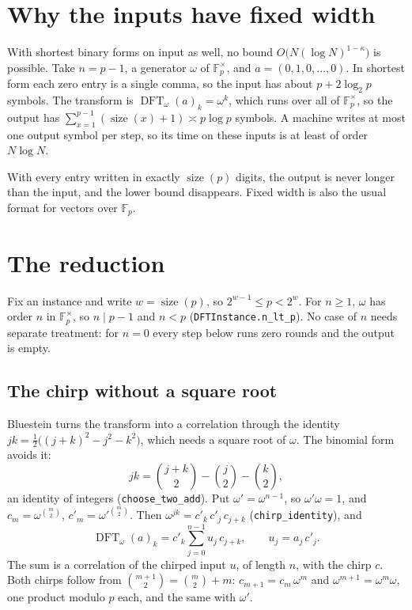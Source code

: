\documentclass[11pt]{amsart}
\newcommand{\F}{\mathbb{F}}
\newcommand{\size}{\operatorname{size}}
\newcommand{\DFT}{\operatorname{DFT}}
\newcommand{\lean}[1]{\texttt{#1}}
\begin{document}
\section{Why the inputs have fixed width}
\label{sec:width}

With shortest binary forms on input as well, no bound $O\bigl(N (\log N)^{1-\kappa}\bigr)$ is
possible. Take $n = p - 1$, a generator $\omega$ of $\F_p^\times$, and
$a = (0, 1, 0, \dots, 0)$. In shortest form each zero entry is a single comma, so the input has
about $p + 2\log_2 p$ symbols. The transform is $\DFT_\omega(a)_k = \omega^k$, which runs over
all of $\F_p^\times$, so the output has $\sum_{x=1}^{p-1} (\size(x) + 1) \asymp p \log p$
symbols. A machine writes at most one output symbol per step, so its time on these inputs is at
least of order $N \log N$.

With every entry written in exactly $\size(p)$ digits, the output is never longer than the
input, and the lower bound disappears. Fixed width is also the usual format for vectors over
$\F_p$.

\section{The reduction}
\label{sec:reduction}

Fix an instance and write $w = \size(p)$, so $2^{w-1} \le p < 2^w$. For $n \ge 1$, $\omega$ has
order $n$ in $\F_p^\times$, so $n \mid p - 1$ and $n < p$ (\lean{DFTInstance.n\_lt\_p}). No case
of $n$ needs separate treatment: for $n = 0$ every step below runs zero rounds and the output is
empty.

\subsection{The chirp without a square root}
Bluestein \cite{Blu} turns the transform into a correlation through the identity
$jk = \tfrac{1}{2}\bigl((j+k)^2 - j^2 - k^2\bigr)$, which needs a square root of $\omega$. The
binomial form avoids it:
\[
  jk = \binom{j+k}{2} - \binom{j}{2} - \binom{k}{2},
\]
an identity of integers (\lean{choose\_two\_add}). Put $\omega' = \omega^{n-1}$, so
$\omega'\omega = 1$, and $c_m = \omega^{\binom{m}{2}}$, $c'_m = \omega'^{\binom{m}{2}}$. Then
$\omega^{jk} = c'_k\, c'_j\, c_{j+k}$ (\lean{chirp\_identity}), and
\[
  \DFT_\omega(a)_k = c'_k \sum_{j=0}^{n-1} u_j\, c_{j+k}, \qquad u_j = a_j\, c'_j .
\]
The sum is a correlation of the chirped input $u$, of length $n$, with the chirp $c$. Both
chirps follow from $\binom{m+1}{2} = \binom{m}{2} + m$: $c_{m+1} = c_m\, \omega^m$ and
$\omega^{m+1} = \omega^m \omega$, one product modulo $p$ each, and the same with $\omega'$.
\end{document}
